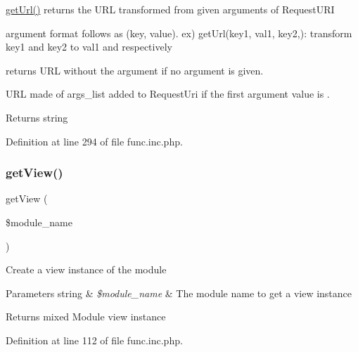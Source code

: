 \hyperlink{func_8inc_8php_accd14bda49a1044b4d8dd93f020f11ee}{get\+Url()} returns the U\+RL transformed from given arguments of Request\+U\+RI 
\begin{DoxyEnumerate}
\item argument format follows as (key, value). ex) get\+Url(\textquotesingle{}key1\textquotesingle{}, \textquotesingle{}val1\textquotesingle{}, \textquotesingle{}key2\textquotesingle{},\textquotesingle{}\textquotesingle{})\+: transform key1 and key2 to val1 and \textquotesingle{}\textquotesingle{} respectively 
\item returns U\+RL without the argument if no argument is given. 
\item U\+RL made of args\+\_\+list added to Request\+Uri if the first argument value is \textquotesingle{}\textquotesingle{}. 
\end{DoxyEnumerate}

\begin{DoxyReturn}{Returns}
string 
\end{DoxyReturn}


Definition at line 294 of file func.\+inc.\+php.

\hypertarget{func_8inc_8php_a49d537fc2c7b51ab5d7b7c6672b21ce3}{}\label{func_8inc_8php_a49d537fc2c7b51ab5d7b7c6672b21ce3} 
\subsubsection{\texorpdfstring{get\+View()}{getView()}}
{\footnotesize\ttfamily get\+View (\begin{DoxyParamCaption}\item[{}]{\$module\+\_\+name }\end{DoxyParamCaption})}

Create a view instance of the module


\begin{DoxyParams}[1]{Parameters}
string & {\em \$module\+\_\+name} & The module name to get a view instance \\
\hline
\end{DoxyParams}
\begin{DoxyReturn}{Returns}
mixed Module view instance 
\end{DoxyReturn}


Definition at line 112 of file func.\+inc.\+php.

\hypertarget{func_8inc_8php_a0d8de97888953b480d02a9c9d845a64c}{}\label{func_8inc_8php_a0d8de97888953b480d02a9c9d845a64c} 

